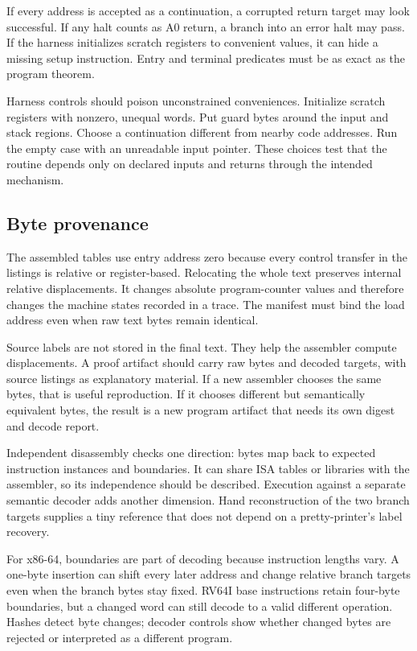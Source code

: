 \begin{warning}[title={A permissive harness can prove the wrong routine}]
If every address is accepted as a continuation, a corrupted return target may
look successful. If any halt counts as A0 return, a branch into an error halt
may pass. If the harness initializes scratch registers to convenient values,
it can hide a missing setup instruction. Entry and terminal predicates must be
as exact as the program theorem.
\end{warning}

Harness controls should poison unconstrained conveniences. Initialize scratch
registers with nonzero, unequal words. Put guard bytes around the input and
stack regions. Choose a continuation different from nearby code addresses.
Run the empty case with an unreadable input pointer. These choices test that
the routine depends only on declared inputs and returns through the intended
mechanism.

\subsection{Byte provenance}

The assembled tables use entry address zero because every control transfer in
the listings is relative or register-based. Relocating the whole text preserves
internal relative displacements. It changes absolute program-counter values
and therefore changes the machine states recorded in a trace. The manifest
must bind the load address even when raw text bytes remain identical.

Source labels are not stored in the final text. They help the assembler
compute displacements. A proof artifact should carry raw bytes and decoded
targets, with source listings as explanatory material. If a new assembler
chooses the same bytes, that is useful reproduction. If it chooses different
but semantically equivalent bytes, the result is a new program artifact that
needs its own digest and decode report.

Independent disassembly checks one direction: bytes map back to expected
instruction instances and boundaries. It can share ISA tables or libraries
with the assembler, so its independence should be described. Execution against
a separate semantic decoder adds another dimension. Hand reconstruction of
the two branch targets supplies a tiny reference that does not depend on a
pretty-printer's label recovery.

For x86-64, boundaries are part of decoding because instruction lengths vary.
A one-byte insertion can shift every later address and change relative branch
targets even when the branch bytes stay fixed. RV64I base instructions retain
four-byte boundaries, but a changed word can still decode to a valid different
operation. Hashes detect byte changes; decoder controls show whether changed
bytes are rejected or interpreted as a different program.

